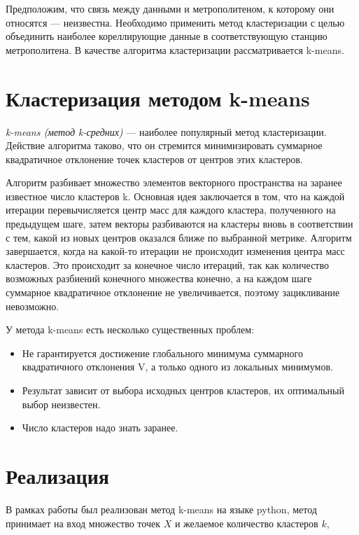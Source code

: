 \documentclass[12pt,a4paper,oneside]{extarticle}
\begin{document}
    Предположим, что связь между данными и метрополитеном, к которому они относятся --- неизвестна. Необходимо применить метод кластеризации с целью объединить наиболее кореллирующие данные в соответствующую станцию метрополитена. В качестве алгоритма кластеризации рассматривается k-means.

\section{Кластеризация методом k-means}
    {\it k-means (метод k-средних)} --- наиболее популярный метод кластеризации. Действие алгоритма таково, что он стремится минимизировать суммарное квадратичное отклонение точек кластеров от центров этих кластеров.

    Алгоритм разбивает множество элементов векторного пространства на заранее известное число кластеров k. Основная идея заключается в том, что на каждой итерации перевычисляется центр масс для каждого кластера, полученного на предыдущем шаге, затем векторы разбиваются на кластеры вновь в соответствии с тем, какой из новых центров оказался ближе по выбранной метрике. Алгоритм завершается, когда на какой-то итерации не происходит изменения центра масс кластеров. Это происходит за конечное число итераций, так как количество возможных разбиений конечного множества конечно, а на каждом шаге суммарное квадратичное отклонение не увеличивается, поэтому зацикливание невозможно.

    У метода k-means есть несколько существенных проблем:
    \begin{itemize}
        \item Не гарантируется достижение глобального минимума суммарного квадратичного отклонения V, а только одного из локальных минимумов.
        \item Результат зависит от выбора исходных центров кластеров, их оптимальный выбор неизвестен.
        \item Число кластеров надо знать заранее.
    \end{itemize}

\section{Реализация}
    В рамках работы был реализован метод k-means на языке python, метод принимает на вход множество точек $X$ и желаемое количество кластеров $k$,
\end{document}
